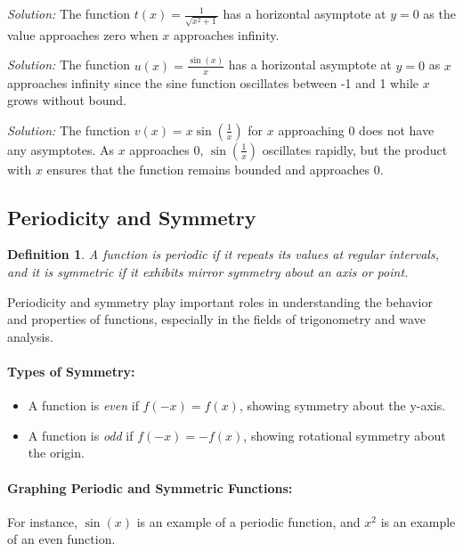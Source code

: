 \documentclass[a4paper,12pt]{book}
\newenvironment{solution}[1][]
{\par\noindent\textit{Solution:} \rmfamily}{\medskip}
\newcounter{example}
\newtheorem{definition}{Definition}
\begin{document}
\begin{solution}[8]
The function \( t(x) = \frac{1}{\sqrt{x^2 + 1}} \) has a horizontal asymptote at \( y = 0 \) as the value approaches zero when \( x \) approaches infinity.
\end{solution}

\begin{solution}[9]
The function \( u(x) = \frac{\sin(x)}{x} \) has a horizontal asymptote at \( y = 0 \) as \( x \) approaches infinity since the sine function oscillates between -1 and 1 while \( x \) grows without bound.
\end{solution}

\begin{solution}[10]
The function \( v(x) = x\sin(\frac{1}{x}) \) for \( x \) approaching 0 does not have any asymptotes. As \( x \) approaches 0, \( \sin(\frac{1}{x}) \) oscillates rapidly, but the product with \( x \) ensures that the function remains bounded and approaches 0.
\end{solution}

\subsection{Periodicity and Symmetry}
\begin{definition}
A function is periodic if it repeats its values at regular intervals, and it is symmetric if it exhibits mirror symmetry about an axis or point.
\end{definition}

Periodicity and symmetry play important roles in understanding the behavior and properties of functions, especially in the fields of trigonometry and wave analysis.

\paragraph{Types of Symmetry:}
\begin{itemize}
    \item A function is \textit{even} if \( f(-x) = f(x) \), showing symmetry about the y-axis.
    \item A function is \textit{odd} if \( f(-x) = -f(x) \), showing rotational symmetry about the origin.
\end{itemize}

\paragraph{Graphing Periodic and Symmetric Functions:}
For instance, \( \sin(x) \) is an example of a periodic function, and \( x^2 \) is an example of an even function. 
\end{document}
